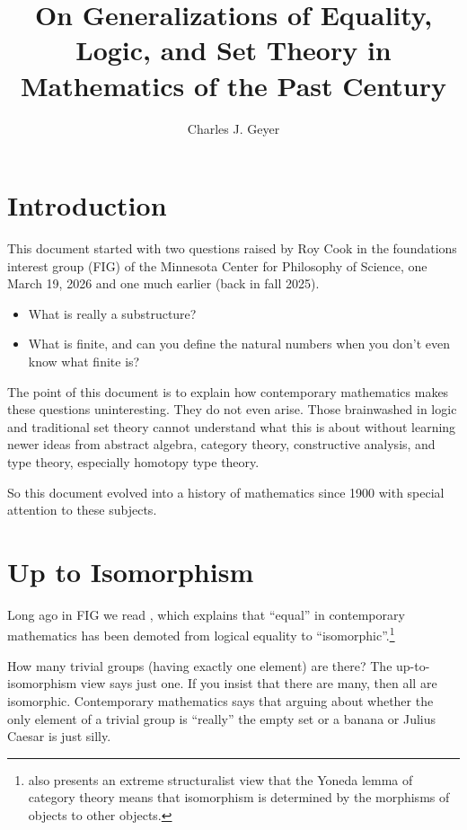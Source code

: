 \documentclass[11pt]{article}
\begin{document}
\title{On Generalizations of Equality, Logic, and Set Theory
    in Mathematics of the Past Century}
\author{Charles J. Geyer}
\maketitle

\section{Introduction}

This document started with two questions raised by Roy Cook
in the foundations interest
group (FIG) of the Minnesota Center for Philosophy of Science, one March 19,
2026 and one much earlier (back in fall 2025).
\begin{itemize}
\item What is really a substructure?
\item What is finite, and can you define the natural
    numbers when you don't even know what finite is?
\end{itemize}

The point of this document is to explain how contemporary mathematics
makes these
questions uninteresting.  They do not even arise.  Those brainwashed in
logic and traditional
set theory cannot understand what this is about without learning
newer ideas from abstract algebra, category theory, constructive analysis,
and type theory, especially homotopy type theory.

So this document evolved into a history of mathematics since 1900
with special attention to these subjects.

\section{Up to Isomorphism}
\label{sec:up-to-isomorphism}

Long ago in FIG we read \citet{mazur}, which explains that ``equal''
in contemporary mathematics has been demoted from logical equality
to ``isomorphic''.\footnote{\citeauthor{mazur} also presents an extreme
structuralist view that the Yoneda lemma of category theory means that
isomorphism is determined by the morphisms of objects to other objects.}

How many trivial groups (having exactly one element) are there?
The up-to-isomorphism view says just one.
If you insist that there are many, then all are isomorphic.
Contemporary mathematics says that arguing about whether the only element of a
trivial group is ``really'' the empty set or a banana or Julius Caesar
is just silly.
\end{document}
